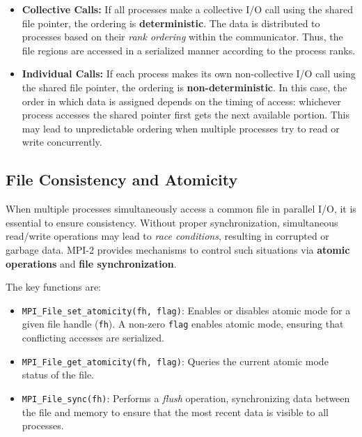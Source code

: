 \documentclass[12pt]{book}
\begin{document}
\begin{itemize}
    \item \textbf{Collective Calls:}  
    If all processes make a collective I/O call using the shared file pointer, the ordering is \textbf{deterministic}.  
    The data is distributed to processes based on their \emph{rank ordering} within the communicator. Thus, the file regions are accessed in a serialized manner according to the process ranks.

    \item \textbf{Individual Calls:}  
    If each process makes its own non-collective I/O call using the shared file pointer, the ordering is \textbf{non-deterministic}.  
    In this case, the order in which data is assigned depends on the timing of access: whichever process accesses the shared pointer first gets the next available portion. This may lead to unpredictable ordering when multiple processes try to read or write concurrently.
\end{itemize}

\subsection{File Consistency and Atomicity}

When multiple processes simultaneously access a common file in parallel I/O, it is essential to ensure consistency. Without proper synchronization, simultaneous read/write operations may lead to \emph{race conditions}, resulting in corrupted or garbage data. MPI-2 provides mechanisms to control such situations via \textbf{atomic operations} and \textbf{file synchronization}.

The key functions are:
\begin{itemize}
    \item \texttt{MPI\_File\_set\_atomicity(fh, flag)}:  
    Enables or disables atomic mode for a given file handle (\texttt{fh}).  
    A non-zero \texttt{flag} enables atomic mode, ensuring that conflicting accesses are serialized.

    \item \texttt{MPI\_File\_get\_atomicity(fh, flag)}:  
    Queries the current atomic mode status of the file.

    \item \texttt{MPI\_File\_sync(fh)}:  
    Performs a \emph{flush} operation, synchronizing data between the file and memory to ensure that the most recent data is visible to all processes.
\end{itemize}
\end{document}
